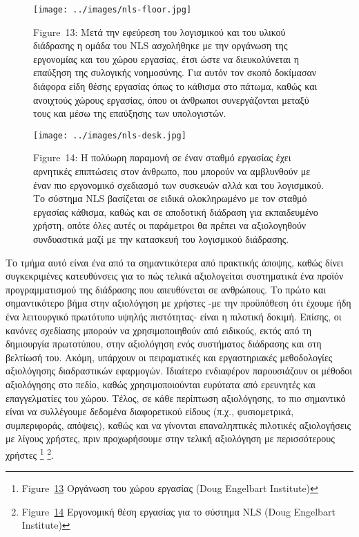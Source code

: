 \documentclass[
]{article}
\begin{document}
\leavevmode{}%
\begin{figure}
\hypertarget{fig:nls-floor}{%
\centering
\texttt{[image: ../images/nls-floor.jpg]}
\caption{Figure~13: Μετά την εφεύρεση του λογισμικού και του υλικού
διάδρασης η ομάδα του NLS ασχολήθηκε με την οργάνωση της εργονομίας και
του χώρου εργασίας, έτσι ώστε να διευκολύνεται η επαύξηση της συλογικής
νοημοσύνης. Για αυτόν τον σκοπό δοκίμασαν διάφορα είδη θέσης εργασίας
όπως το κάθισμα στο πάτωμα, καθώς και ανοιχτούς χώρους εργασίας, όπου οι
άνθρωποι συνεργάζονται μεταξύ τους και μέσω της επαύξησης των
υπολογιστών.}\label{fig:nls-floor}
}
\end{figure}

\leavevmode{}%
\begin{figure}
\hypertarget{fig:nls-desk}{%
\centering
\texttt{[image: ../images/nls-desk.jpg]}
\caption{Figure~14: Η πολύωρη παραμονή σε έναν σταθμό εργασίας έχει
αρνητικές επιπτώσεις στον άνθρωπο, που μπορούν να αμβλυνθούν με έναν πιο
εργονομικό σχεδιασμό των συσκευών αλλά και του λογισμικού. Το σύστημα
NLS βασίζεται σε ειδικά ολοκληρωμένο με τον σταθμό εργασίας κάθισμα,
καθώς και σε αποδοτική διάδραση για εκπαιδευμένο χρήστη, οπότε όλες
αυτές οι παράμετροι θα πρέπει να αξιολογηθούν συνδυαστικά μαζί με την
κατασκευή του λογισμικού διάδρασης.}\label{fig:nls-desk}
}
\end{figure}

Το τμήμα αυτό είναι ένα από τα σημαντικότερα από πρακτικής άποψης, καθώς
δίνει συγκεκριμένες κατευθύνσεις για το πώς τελικά αξιολογείται
συστηματικά ένα προϊόν προγραμματισμού της διάδρασης που απευθύνεται σε
ανθρώπους. Το πρώτο και σημαντικότερο βήμα στην αξιολόγηση με χρήστες
-με την προϋπόθεση ότι έχουμε ήδη ένα λειτουργικό πρωτότυπο υψηλής
πιστότητας- είναι η πιλοτική δοκιμή. Επίσης, οι κανόνες σχεδίασης
μπορούν να χρησιμοποιηθούν από ειδικούς, εκτός από τη δημιουργία
πρωτοτύπου, στην αξιολόγηση ενός συστήματος διάδρασης και στη βελτίωσή
του. Ακόμη, υπάρχουν οι πειραματικές και εργαστηριακές μεθοδολογίες
αξιολόγησης διαδραστικών εφαρμογών. Ιδιαίτερο ενδιαφέρον παρουσιάζουν οι
μέθοδοι αξιολόγησης στο πεδίο, καθώς χρησιμοποιούνται ευρύτατα από
ερευνητές και επαγγελματίες του χώρου. Τέλος, σε κάθε περίπτωση
αξιολόγησης, το πιο σημαντικό είναι να συλλέγουμε δεδομένα διαφορετικού
είδους (π.χ., φυσιομετρικά, συμπεριφοράς, απόψεις), καθώς και να
γίνονται επαναληπτικές πιλοτικές αξιολογήσεις με λίγους χρήστες, πριν
προχωρήσουμε στην τελική αξιολόγηση με περισσότερους χρήστες \footnote{Figure~\protect\hyperlink{fig:nls-floor}{13}
  Οργάνωση του χώρου εργασίας (Doug Engelbart Institute)} \footnote{Figure~\protect\hyperlink{fig:nls-desk}{14}
  Εργονομική θέση εργασίας για το σύστημα NLS (Doug Engelbart Institute)}.
\end{document}

